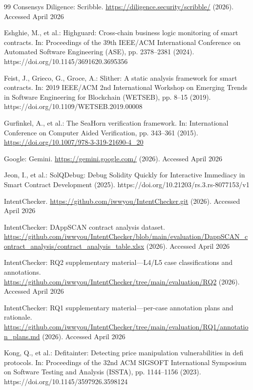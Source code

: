 \documentclass[pdflatex,sn-basic]{sn-jnl}%
\theoremstyle{thmstyleone}%
\theoremstyle{thmstyletwo}%
\theoremstyle{thmstylethree}%
\begin{document}
\begin{thebibliography}{99}
Consensys Diligence: Scribble. \url{https://diligence.security/scribble/} (2026). Accessed April 2026

Eshghie, M., et al.: Highguard: Cross-chain business logic monitoring of smart contracts. In: Proceedings of the 39th IEEE/ACM International Conference on Automated Software Engineering (ASE), pp. 2378--2381 (2024). https://doi.org/10.1145/3691620.3695356

Feist, J., Grieco, G., Groce, A.: Slither: A static analysis framework for smart contracts. In: 2019 IEEE/ACM 2nd International Workshop on Emerging Trends in Software Engineering for Blockchain (WETSEB), pp. 8--15 (2019). https://doi.org/10.1109/WETSEB.2019.00008

Gurfinkel, A., et al.: The SeaHorn verification framework. In: International Conference on Computer Aided Verification, pp. 343--361 (2015). \url{https://doi.org/10.1007/978-3-319-21690-4_20}

Google: Gemini. \url{https://gemini.google.com/} (2026). Accessed April 2026

Jeon, I., et al.: SolQDebug: Debug Solidity Quickly for Interactive Immediacy in Smart Contract Development (2025). https://doi.org/10.21203/rs.3.rs-8077153/v1

IntentChecker. \url{https://github.com/iwwyou/IntentChecker.git} (2026). Accessed April 2026

IntentChecker: DAppSCAN contract analysis dataset. \url{https://github.com/iwwyou/IntentChecker/blob/main/evaluation/DappSCAN_contract_analysis/contract_analysis_table.xlsx} (2026). Accessed April 2026

IntentChecker: RQ2 supplementary material---L4/L5 case classifications and annotations. \url{https://github.com/iwwyou/IntentChecker/tree/main/evaluation/RQ2} (2026). Accessed April 2026

IntentChecker: RQ1 supplementary material---per-case annotation plans and rationale. \url{https://github.com/iwwyou/IntentChecker/tree/main/evaluation/RQ1/annotation_plans.md} (2026). Accessed April 2026

Kong, Q., et al.: Defitainter: Detecting price manipulation vulnerabilities in defi protocols. In: Proceedings of the 32nd ACM SIGSOFT International Symposium on Software Testing and Analysis (ISSTA), pp. 1144--1156 (2023). https://doi.org/10.1145/3597926.3598124


\end{thebibliography}
\end{document}
